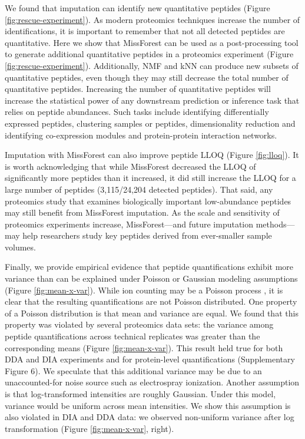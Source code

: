 \documentclass{article}
\begin{document}
We found that imputation can identify new quantitative peptides (Figure \ref{fig:rescue-experiment}). As modern proteomics techniques increase the number of identifications, it is important to remember that not all detected peptides are quantitative. Here we show that MissForest can be used as a post-processing tool to generate additional quantitative peptides in a proteomics experiment (Figure \ref{fig:rescue-experiment}). Additionally, NMF and kNN can produce new subsets of quantitative peptides, even though they may still decrease the total number of quantitative peptides. Increasing the number of quantitative peptides will increase the statistical power of any downstream prediction or inference task that relies on peptide abundances. Such tasks include identifying differentially expressed peptides, clustering samples or peptides, dimensionality reduction and identifying co-expression modules and protein-protein interaction networks.

Imputation with MissForest can also improve peptide LLOQ (Figure \ref{fig:lloq}). It is worth acknowledging that while MissForest decreased the LLOQ of significantly more peptides than it increased, it did still increase the LLOQ for a large number of peptides (3,115/24,204 detected peptides). That said, any proteomics study that examines biologically important low-abundance peptides may still benefit from MissForest imputation. As the scale and sensitivity of proteomics experiments increase, MissForest---and future imputation methods---may help researchers study key peptides derived from ever-smaller sample volumes. 

Finally, we provide empirical evidence that peptide quantifications exhibit more variance than can be explained under Poisson or Gaussian modeling assumptions (Figure \ref{fig:mean-x-var}). While ion counting may be a Poisson process \cite{ms-dist-derivation, stat-theory-lcms, kimmel-2005}, it is clear that the resulting quantifications are not Poisson distributed. One property of a Poisson distribution is that mean and variance are equal. We found that this property was violated by several proteomics data sets: the variance among peptide quantifications across technical replicates was greater than the corresponding means (Figure \ref{fig:mean-x-var}). This result held true for both DDA and DIA experiments and for protein-level quantifications (Supplementary Figure 6). We speculate that this additional variance may be due to an unaccounted-for noise source such as electrospray ionization. Another assumption is that log-transformed intensities are roughly Gaussian. Under this model, variance would be uniform across mean intensities. We show this assumption is also violated in DIA and DDA data: we observed non-uniform variance after log transformation (Figure \ref{fig:mean-x-var}, right).
\end{document}
